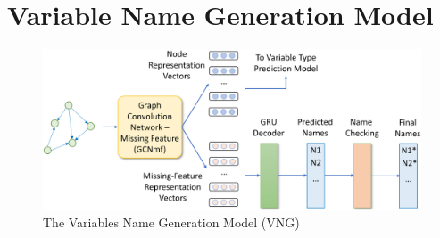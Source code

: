 \section{Variable Name Generation Model}
\label{sec:name-gen}

\begin{figure}[ht]
	\begin{center}
	  \includegraphics[width=5.7in]{figures/name-gen-model}
          \vspace{-6pt}
		\caption{The Variables Name Generation Model (VNG)}
		\label{fig:name-gen}
	\end{center}
\end{figure}
